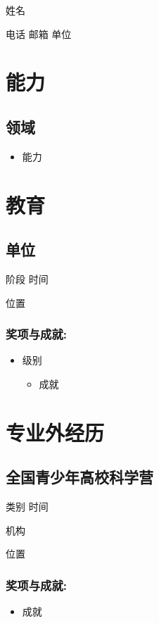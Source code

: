 \documentclass{resume_cn}
\begin{document}
\centerline{\Huge{姓名}}
\vspace{1.25ex}

\centerline{\sffamily\large{
    电话\textperiodcentered
    邮箱\textperiodcentered
    单位
}}
\vspace{1.5ex}

\section{能力}
    \subsection{领域}
    \begin{itemize}
        \item 能力
    \end{itemize}
\section{教育}
    \subsection{单位}
        阶段 \hfill 时间

        位置

        \subsubsection{奖项与成就:}
        \begin{itemize}
            \item 级别
            \begin{itemize}
                \item 成就
            \end{itemize}
        \end{itemize}

\section{专业外经历}
    \subsection{全国青少年高校科学营}
        类别 \hfill 时间

        机构

        位置

        \subsubsection{奖项与成就:}
        \begin{itemize}
            \item 成就
        \end{itemize}
\end{document}

